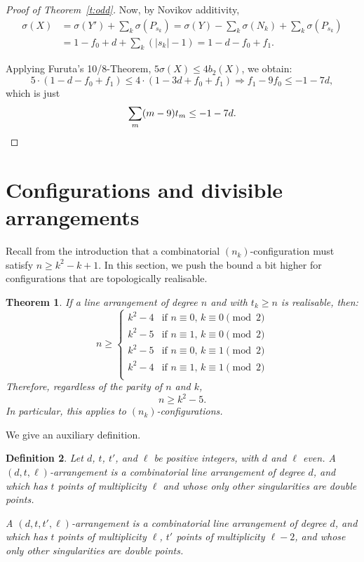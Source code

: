 \documentclass[a4paper,12pt, onesided]{amsart}
\newtheorem{thm}{Theorem}[section]
\newtheorem{defn}[thm]{Definition}
\theoremstyle{remark}
\numberwithin{figure}{section}
\numberwithin{equation}{section}
\newcommand{\cP}{\mathcal{P}}
\renewcommand{\L}{\mathcal{L}}
\begin{document}
\begin{proof}[Proof of Theorem~\ref{t:odd}]
Now, by Novikov additivity,
\begin{align*}
\sigma(X) &= \sigma(Y') + \sum_k \sigma(P_{s_k}) = \sigma(Y) - \sum_k \sigma(N_k) + \sum_k \sigma(P_{s_k})\\
& = 1-f_0 + d + \sum_k (|s_k|-1) = 1 - d - f_0 + f_1.
\end{align*}

Applying Furuta's 10/8-Theorem, $5\sigma(X) \le 4b_2(X)$, we obtain:
\[
5\cdot (1-d - f_0 + f_1) \le 4\cdot(1-3d+f_0+f_1) \Rightarrow f_1 - 9f_0 \le -1 - 7d,
\]
which is just
\[
\sum_m (m-9)t_m \le -1-7d.\qedhere
\]
\end{proof}

\section{Configurations and divisible arrangements}\label{s:configurations}

Recall from the introduction that a combinatorial $(n_k)$-configuration must satisfy $n \ge k^2-k+1$.
In this section, we push the bound a bit higher for configurations that are topologically realisable.

\begin{thm}\label{t:configurations}
If a line arrangement of degree $n$ and with $t_k \ge n$ is realisable, then:
\[
n \ge \left\{\begin{array}{ll}
k^2 - 4 & \mbox{if } n \equiv 0,\, k \equiv 0 \pmod 2\\
k^2 - 5 & \mbox{if } n \equiv 1,\, k \equiv 0 \pmod 2\\
k^2 - 5 & \mbox{if } n \equiv 0,\, k \equiv 1 \pmod 2\\
k^2 - 4 & \mbox{if } n \equiv 1,\, k \equiv 1 \pmod 2\\
\end{array}
\right.
\]
Therefore, regardless of the parity of $n$ and $k$,
\[
n \ge k^2-5.
\]
In particular, this applies to $(n_k)$-configurations.
\end{thm}

We give an auxiliary definition.

\begin{defn}
Let $d$, $t$, $t'$, and $\ell$ be positive integers, with $d$ and $\ell$ even.
A \emph{$(d,t,\ell)$-arrangement} is a combinatorial line arrangement of degree $d$, and which has $t$ points of multiplicity $\ell$ and whose only other singularities are double points.

A \emph{$(d,t,t',\ell)$-arrangement} is a combinatorial line arrangement of degree $d$, and which has $t$ points of multiplicity $\ell$, $t'$ points of multiplicity $\ell-2$, and whose only other singularities are double points.
\end{defn}
\end{document}

